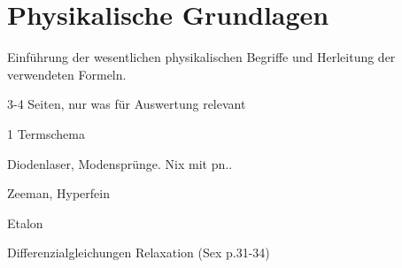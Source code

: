 \section{Physikalische Grundlagen}
Einführung der wesentlichen physikalischen Begriffe und Herleitung der verwendeten Formeln.

3-4 Seiten, nur was für Auswertung relevant

1 Termschema

Diodenlaser, Modensprünge. Nix mit pn..

Zeeman, Hyperfein

Etalon

Differenzialgleichungen Relaxation (Sex p.31-34)